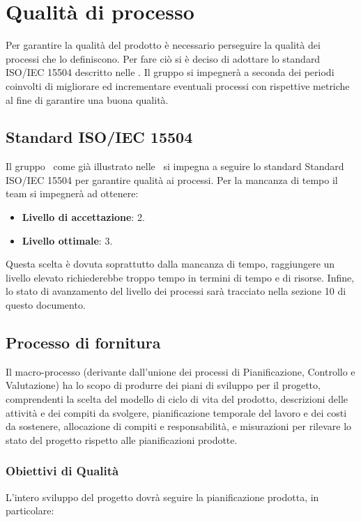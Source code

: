 \newpage

\section{Qualità di processo}
Per garantire la qualità del prodotto è necessario perseguire la qualità dei processi che lo definiscono. Per fare ciò si è deciso di adottare lo standard ISO/IEC 15504 descritto nelle \NdP. Il gruppo \gruppo{} si impegnerà a seconda dei periodi coinvolti di migliorare ed incrementare eventuali processi con rispettive metriche al fine di garantire una buona qualità.

\subsection{Standard ISO/IEC 15504}
Il gruppo \gruppo\ come già illustrato nelle \NdP\ si impegna a seguire lo standard Standard ISO/IEC 15504 per garantire qualità ai processi. Per la mancanza di tempo il team si impegnerà ad ottenere:
\begin{itemize}
\item \textbf{Livello di accettazione}: 2.
\item \textbf{Livello ottimale}: 3.
\end{itemize}
Questa scelta è dovuta soprattutto dalla mancanza di tempo, raggiungere un livello elevato richiederebbe troppo tempo in termini di tempo e di risorse. Infine, lo stato di avanzamento del livello dei processi sarà tracciato nella sezione 10 di questo documento.

\subsection{Processo di fornitura}
Il macro-processo (derivante dall’unione dei processi di Pianificazione, Controllo e Valutazione) ha lo scopo di produrre dei piani di sviluppo per il progetto, comprendenti
la scelta del modello di ciclo di vita del prodotto, descrizioni delle attività e dei compiti
da svolgere, pianificazione temporale del lavoro e dei costi da sostenere, allocazione di compiti e
responsabilità, e misurazioni per rilevare lo stato del progetto rispetto alle pianificazioni prodotte.

\subsubsection{Obiettivi di Qualità}
L'intero sviluppo del progetto dovrà seguire la pianificazione prodotta, in particolare:

